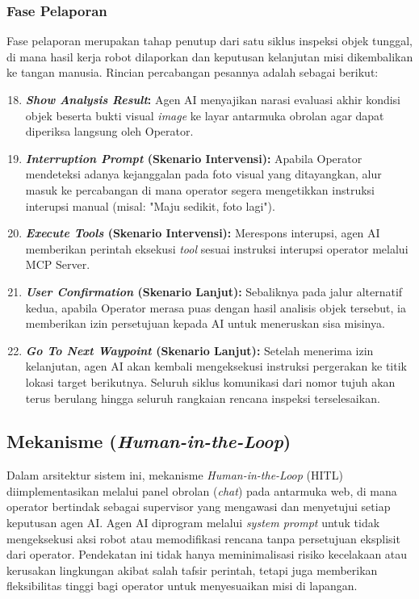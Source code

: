 \subsubsection{Fase Pelaporan}

Fase pelaporan merupakan tahap penutup dari satu siklus inspeksi objek tunggal, di mana hasil kerja robot dilaporkan dan keputusan kelanjutan misi dikembalikan ke tangan manusia. Rincian percabangan pesannya adalah sebagai berikut:

\begin{enumerate}
    \setcounter{enumi}{17}
    \item \textbf{\textit{Show Analysis Result}:} Agen AI menyajikan narasi evaluasi akhir kondisi objek beserta bukti visual \textit{image} ke layar antarmuka obrolan agar dapat diperiksa langsung oleh Operator.
    \item \textbf{\textit{Interruption Prompt} (Skenario Intervensi):} Apabila Operator mendeteksi adanya kejanggalan pada foto visual yang ditayangkan, alur masuk ke percabangan di mana operator segera mengetikkan instruksi interupsi manual (misal: "Maju sedikit, foto lagi").
    \item \textbf{\textit{Execute Tools} (Skenario Intervensi):} Merespons interupsi, agen AI memberikan perintah eksekusi \textit{tool} sesuai instruksi interupsi operator melalui MCP Server.
    \item \textbf{\textit{User Confirmation} (Skenario Lanjut):} Sebaliknya pada jalur alternatif kedua, apabila Operator merasa puas dengan hasil analisis objek tersebut, ia memberikan izin persetujuan kepada AI untuk meneruskan sisa misinya.
    \item \textbf{\textit{Go To Next Waypoint} (Skenario Lanjut):} Setelah menerima izin kelanjutan, agen AI akan kembali mengeksekusi instruksi pergerakan ke titik lokasi target berikutnya. Seluruh siklus komunikasi dari nomor tujuh akan terus berulang hingga seluruh rangkaian rencana inspeksi terselesaikan.
\end{enumerate}

\subsection{Mekanisme (\textit{Human-in-the-Loop})}

Dalam arsitektur sistem ini, mekanisme \textit{Human-in-the-Loop} (HITL) diimplementasikan melalui panel obrolan (\textit{chat}) pada antarmuka web, di mana operator bertindak sebagai supervisor yang mengawasi dan menyetujui setiap keputusan agen AI. Agen AI diprogram melalui \textit{system prompt} untuk tidak mengeksekusi aksi robot atau memodifikasi rencana tanpa persetujuan eksplisit dari operator. Pendekatan ini tidak hanya meminimalisasi risiko kecelakaan atau kerusakan lingkungan akibat salah tafsir perintah, tetapi juga memberikan fleksibilitas tinggi bagi operator untuk menyesuaikan misi di lapangan.


